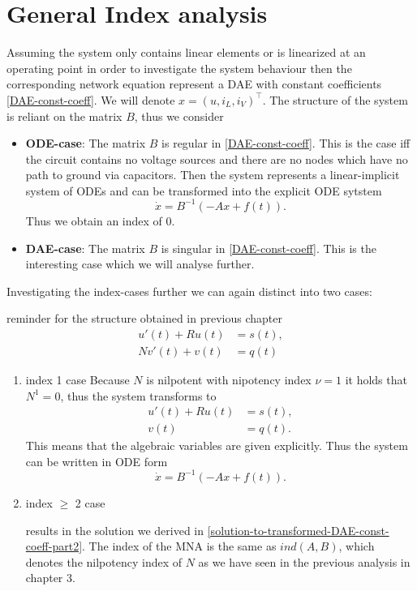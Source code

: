 \section{General Index analysis}

Assuming the system only contains linear elements or is linearized at an operating point in order to investigate the system behaviour then the corresponding network equation represent a DAE with constant coefficients \ref{DAE-const-coeff}. We will denote $x=(u, i_L, i_V)^\top$. The structure of the system is reliant on the matrix $B$, thus we consider

\begin{itemize}
	\item \textbf{ODE-case}: \newline
	The matrix $B$ is regular in \ref{DAE-const-coeff}. This is the case iff the circuit contains no voltage sources and there are no nodes which have no path to ground via capacitors. Then the system represents a linear-implicit system of ODEs and can be transformed into the explicit ODE sytstem
	\begin{displaymath}
		\dot{x}=B^{-1}(-Ax+f(t)).
	\end{displaymath}
	Thus we obtain an index of $0$.
		
	\item \textbf{DAE-case}:
	The matrix $B$ is singular in \ref{DAE-const-coeff}. This is the interesting case which we will analyse further.
\end{itemize}



Investigating the index-cases further we can again distinct into two cases:

reminder for the structure obtained in previous chapter
\begin{align*}
	u'(t) + Ru(t) &= s(t), \\
	Nv'(t) + v(t) &= q(t)
\end{align*}

\begin{enumerate}
	\item index 1 case
	Because $N$ is nilpotent with nipotency index $\nu = 1$ it holds that $N^1 = 0$, thus the system transforms to
	\begin{align*}
		u'(t) + Ru(t) &= s(t), \\
		v(t) &= q(t).
	\end{align*}
	This means that the algebraic variables are given explicitly. Thus the system can be written in ODE form
	\begin{displaymath}
		\dot{x}=B^{-1}(-Ax+f(t)).
	\end{displaymath}

	\item index $\geq$ 2 case
	
	results in the solution we derived in \ref{solution-to-transformed-DAE-const-coeff-part2}. The index of the MNA is the same as $ind(A,B)$, which denotes the nilpotency index of $N$ as we have seen in the previous analysis in chapter 3.
\end{enumerate}


